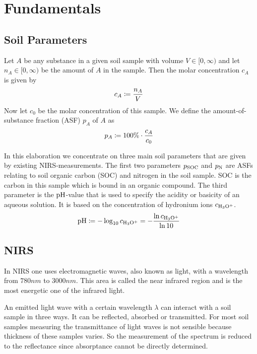 \section{Fundamentals}
\label{sec:fundamentals}
	
	\subsection{Soil Parameters}
	\label{ssec:soil-parameters}
	
		Let $A$ be any substance in a given soil sample with volume $V\in[0,\infty)$ and let $n_A\in[0,\infty)$ be the amount of $A$ in the sample.
		Then the molar concentration $c_A$ is given by
		\[
			c_A \coloneqq \frac{n_A}{V}
		\]
		Now let $c_0$ be the molar concentration of this sample.
		We define the amount-of-substance fraction (ASF) $p_A$ of $A$ as 
		\[
			p_A \coloneqq 100\%\cdot\frac{c_A}{c_0}
		\]

		In this elaboration we concentrate on three main soil parameters that are given by existing NIRS-measurements.
		The first two parameters $p_{\mathrm{SOC}}$ and $p_{\mathrm{N}}$ are ASFs relating to soil organic carbon (SOC) and nitrogen in the soil sample.
		SOC is the carbon in this sample which is bound in an organic compound.
		The third parameter is the $\mathrm{pH}$-value that is used to specify the acidity or basicity of an aqueous solution.
		It is based on the concentration of hydronium ions $c_{\mathrm{H_3O^+}}$.
		\[
			\mathrm{pH} \coloneqq -\log_{10} c_{\mathrm{H_3O^+}} = -\frac{\ln c_{\mathrm{H_3O^+}}}{\ln 10}
		\]
	

	\subsection{NIRS}
	\label{ssec:nirs}
	
		In NIRS one uses electromagnetic waves, also known as light, with a wavelength from $780\unit{nm}$ to $3000\unit{nm}$.
		This area is called the near infrared region and is the most energetic one of the infrared light.

		An emitted light wave with a certain wavelength $\lambda$ can interact with a soil sample in three ways.
		It can be reflected, absorbed or transmitted.
		For most soil samples measuring the transmittance of light waves is not sensible because thickness of these samples varies.
		So the measurement of the spectrum is reduced to the reflectance since absorptance cannot be directly determined.

